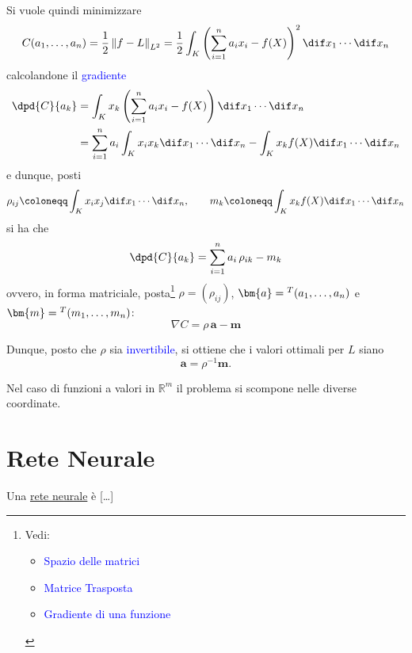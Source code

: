 \documentclass[10pt]{book}
\newcommand{\1}{\mathds{1}}
\newcommand{\R}{\mathds{R}}
\newcommand{\norma}[1]{%
\left\lVert#1\right\rVert%
}
\theoremstyle{definition}%
\theoremstyle{plain}
\theoremstyle{remark}
\renewcommand{\href}[2]{\textcolor{blue}{#2}}
\begin{document}
Si vuole quindi minimizzare
\begin{equation*}
C(a_{1},\dots,a_{n}) = \frac{1}{2}\norma{f-L}_{L^{2}} = \frac{1}{2}\int_{K} \left(\sum_{i=1}^{n} a_{i}x_{i} - f(X)\right)^{2}\dif x_{1}\cdots\dif x_{n}
\end{equation*}
calcolandone il \href{../../../../../org/roam/20250624171244-gradiente_di_una_funzione.org}{gradiente}
\begin{align*}
\dpd{C}{a_{k}} &= \int_{K} x_{k} \left(\sum_{i=1}^{n} a_{i}x_{i} - f(X)\right)\dif x_{1}\cdots\dif x_{n}\\
&= \sum_{i=1}^{n} a_{i} \int_{K} x_{i} x_{k}\dif x_{1}\cdots\dif x_{n} - \int_{K} x_{k} f(X)\dif x_{1}\cdots\dif x_{n}
\end{align*}
e dunque, posti
\begin{equation*}
\rho_{ij} \coloneqq \int_{K} x_{i}x_{j}\dif x_{1}\cdots\dif x_{n},\qquad m_{k} \coloneqq \int_{K} x_{k}f(X)\dif x_{1}\cdots\dif x_{n}
\end{equation*}
si ha che
\begin{equation*}
\dpd{C}{a_{k}} = \sum_{i=1}^{n}a_{i}\,\rho_{ik} - m_{k}
\end{equation*}
ovvero, in forma matriciale, posta\footnote{Vedi:
\begin{itemize}
\item \href{../../../../../org/roam/20250104111539-spazio_delle_matrici.org}{Spazio delle matrici}
\item \href{../../../../../org/roam/20250113144338-matrice_trasposta.org}{Matrice Trasposta}
\item \href{../../../../../org/roam/20250624171244-gradiente_di_una_funzione.org}{Gradiente di una funzione}
\end{itemize}} \(\rho=(\rho_{ij})\), \(\bm{a} = \null^{T}(a_{1},\dots,a_{n})\) e \(\bm{m} = \null^{T}(m_{1},\dots,m_{n})\):
\begin{equation*}
\nabla C = \rho\, \bm{a} - \bm{m}
\end{equation*}

Dunque, posto che \(\rho\) sia \href{../../../../../org/roam/20250104111735-matrice_invertibile.org}{invertibile}, si ottiene che i valori ottimali per \(L\) siano
\begin{equation*}
\bm{a} = \rho^{-1}\bm{m}.
\end{equation*}

Nel caso di funzioni a valori in \(\R^{m}\) il problema si scompone nelle diverse coordinate.
\section{Rete Neurale}
\label{sec:org056a6da}
Una \uline{rete neurale} è [\ldots{}]
\end{document}
